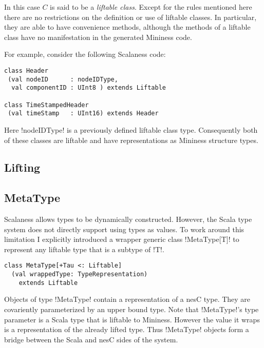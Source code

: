 In this case $C$ is said to be a \textit{liftable class}. Except for the rules mentioned here
there are no restrictions on the definition or use of liftable classes. In particular, they are
able to have convenience methods, although the methods of a liftable class have no manifestation
in the generated Mininess code.

For example, consider the following Scalaness code:

\singlespace
\begin{lstlisting}[language=scalaness]
class Header
 (val nodeID      : nodeIDType,
  val componentID : UInt8 ) extends Liftable

class TimeStampedHeader
 (val timeStamp   : UInt16) extends Header
\end{lstlisting}
\primaryspacing

Here !nodeIDType! is a previously defined liftable class type. Consequently both of these
classes are liftable and have representations as Mininess structure types. 

\subsection{Lifting}
\label{section-lifting}


\subsection{MetaType}
\label{section-metatype}

Scalaness allows types to be dynamically constructed. However, the Scala type system does not
directly support using types as values. To work around this limitation I explicitly introduced
a wrapper generic class !MetaType[T]! to represent any liftable type that is a subtype of !T!.

\singlespace
\begin{lstlisting}[language=scalaness]
class MetaType[+Tau <: Liftable]
  (val wrappedType: TypeRepresentation)
    extends Liftable
\end{lstlisting}
\primaryspacing

Objects of type !MetaType! contain a representation of a nesC type. They are covariently
parameterized by an upper bound type. Note that !MetaType!'s type parameter is a Scala type that
is liftable to Mininess. However the value it wraps is a representation of the already lifted
type. Thus !MetaType! objects form a bridge between the Scala and nesC sides of the system.

